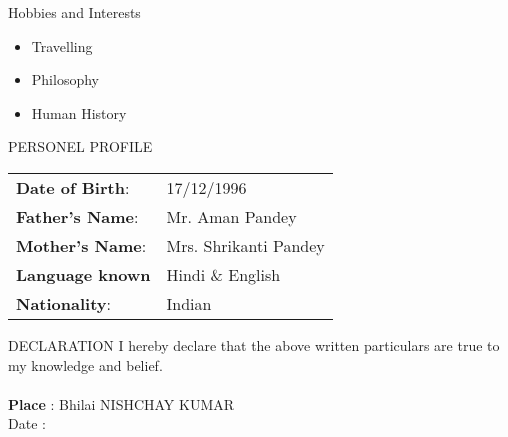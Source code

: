 \documentclass{resume} %
\begin{document}

\begin{rSection}{Hobbies and Interests} \itemsep -3pt
\begin{itemize}
\item 	Travelling 
\item	Philosophy 
\item	Human History\\
\end{itemize}


\end{rSection}

\begin{rSection}{PERSONEL PROFILE}
\begin{tabular}{ll}
	\textbf{Date of Birth}:  &    	17/12/1996 \\
   \textbf{Father’s Name}:  &   	Mr. Aman Pandey\\
	\textbf{Mother’s Name}:	&  Mrs. Shrikanti Pandey\\
	\textbf{Language known}  &      Hindi \& English\\
	\textbf{Nationality}:    &	Indian

\end{tabular}

\end{rSection}
\begin{rSection}{DECLARATION}
I hereby declare that the above written particulars are true to my knowledge and belief.\\ \\
\textbf{Place} : Bhilai  \hfill {\emph{}{NISHCHAY KUMAR}} 
\\Date  :



\end{rSection}
\end{document}

